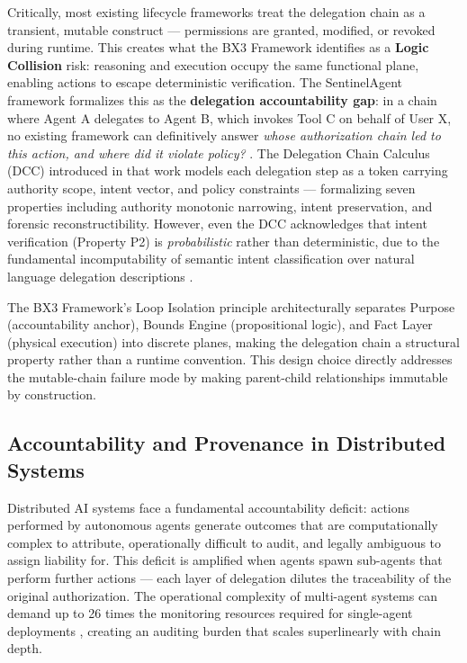 Critically, most existing lifecycle frameworks treat the delegation chain as a transient, mutable construct — permissions are granted, modified, or revoked during runtime. This creates what the BX3 Framework identifies as a \textbf{Logic Collision} risk: reasoning and execution occupy the same functional plane, enabling actions to escape deterministic verification. The SentinelAgent framework formalizes this as the \textbf{delegation accountability gap}: in a chain where Agent A delegates to Agent B, which invokes Tool C on behalf of User X, no existing framework can definitively answer \emph{whose authorization chain led to this action, and where did it violate policy?} \cite{sentinel_agent_2026}. The Delegation Chain Calculus (DCC) introduced in that work models each delegation step as a token carrying authority scope, intent vector, and policy constraints — formalizing seven properties including authority monotonic narrowing, intent preservation, and forensic reconstructibility. However, even the DCC acknowledges that intent verification (Property P2) is \emph{probabilistic} rather than deterministic, due to the fundamental incomputability of semantic intent classification over natural language delegation descriptions \cite[Proposition 1]{sentinel_agent_2026}.

The BX3 Framework's Loop Isolation principle architecturally separates Purpose (accountability anchor), Bounds Engine (propositional logic), and Fact Layer (physical execution) into discrete planes, making the delegation chain a structural property rather than a runtime convention. This design choice directly addresses the mutable-chain failure mode by making parent-child relationships immutable by construction.

\subsection{Accountability and Provenance in Distributed Systems}
\label{sec:provenance}

Distributed AI systems face a fundamental accountability deficit: actions performed by autonomous agents generate outcomes that are computationally complex to attribute, operationally difficult to audit, and legally ambiguous to assign liability for. This deficit is amplified when agents spawn sub-agents that perform further actions — each layer of delegation dilutes the traceability of the original authorization. The operational complexity of multi-agent systems can demand up to 26 times the monitoring resources required for single-agent deployments \cite{lumenova_govern_2025}, creating an auditing burden that scales superlinearly with chain depth.

